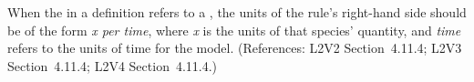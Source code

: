 When the  in a \RateRule definition refers to a \Species,
the units of the rule's right-hand side should be of the form \emph{x per
time}, where \emph{x} is the units of that species' quantity, and
\emph{time} refers to the units of time for the model.  (References: L2V2
Section~4.11.4; L2V3 Section~4.11.4; L2V4 Section~4.11.4.)
